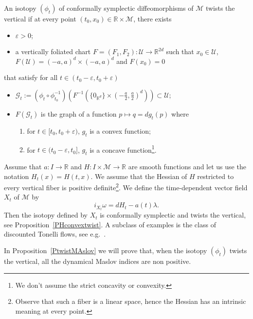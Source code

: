\documentclass[AHL, Unicode, longabstracts, published]{cedram}
\newcommand*\cg{\mathcal{G}}
\newcommand*\cU{\mathcal{U}}
\newcommand*\cal{\mathcal}
\newcommand*\R{\mathbb{R}}
\begin{document}
\begin{defi}\label{def-twist}
An isotopy $(\phi_t)$ of conformally symplectic diffeomorphisms of $\cal M$ twists the vertical if at every point $(t_0, x_0)\in \R\times \cal M$, there exists
\begin{itemize}
\item $\varepsilon>0$;
\item a vertically foliated chart $F=(F_1, F_2): \cU\rightarrow\R^{2d}$ such that $x_0\in\cal U$, $F(\cal U)=(-a, a)^{d}\times (-a, a)^d$ and $F(x_0)=0$
\end{itemize}
that satisfy for all $t\in (t_0-\varepsilon, t_0+\varepsilon)$
\begin{itemize}
\item ${\cg}_t:=(\phi_t\circ\phi_{t_0}^{-1})(F^{-1}(\{ 0_{\R^d}\}\times (-\frac{a}{2}, \frac{a}{2})^d)) \subset\cU$;
\item $F({\cg_t})$ is the graph of a function $p\mapsto q=dg_t(p)$ where
\begin{enumerate}
\item\label{defi1.7.1} for $t\in [t_0, t_0+\varepsilon)$, $g_t$ is a convex function;
\item\label{defi1.7.2} for $t\in (t_0-\varepsilon, t_0]$, $g_t$ is a concave function\footnote{We don't assume the strict concavity or convexity.}.
\end{enumerate}
\end{itemize}
\end{defi}

\begin{exam}
Assume that $a:I\rightarrow \R$ and $H:I\times \cal M\rightarrow \R$ are smooth functions and let us use the notation $H_t(x)=H(t, x)$. We assume that the Hessian of $H$ restricted to every vertical fiber is positive definite\footnote{Observe that such a fiber is a linear space, hence the Hessian has an intrinsic meaning at every point.}. We define the time-dependent vector field $X_t$ of $\cal M$ by
\[
i_{X_t}\omega=dH_t-a(t)\lambda.
\]
Then the isotopy defined by $X_t$ is conformally symplectic and twists the vertical, see Proposition~\ref{PHconvextwist}. A subclass of examples is the class of discounted Tonelli flows, see e.g.~\cite{MaroSor2017}.
\end{exam}


\begin{rema}
In Proposition~\ref{PtwistMAslov} we will prove that, when the isotopy $(\phi_t)$ twists the vertical, all the dynamical Maslov indices are non positive.
\end{rema}
\end{document}
